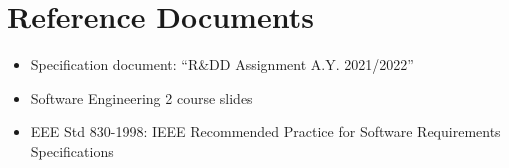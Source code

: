\section{Reference Documents}

\begin{itemize}
    \item Specification document: “R\&DD Assignment A.Y. 2021/2022”
    \item Software Engineering 2 course slides
    \item EEE Std 830-1998: IEEE Recommended Practice for Software Requirements Specifications
\end{itemize}


